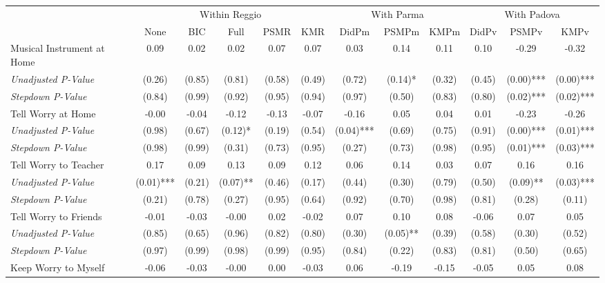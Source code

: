 \begin{tabular}{l c c c c c c c c c c c}
\toprule
& \multicolumn{5}{c}{Within Reggio} & \multicolumn{3}{c}{With Parma} & \multicolumn{3}{c}{With Padova} \\\cmidrule(lr){2-6} \cmidrule(lr){7-9} \cmidrule(lr){10-12}
 & None & BIC & Full & PSMR & KMR & DidPm & PSMPm & KMPm & DidPv & PSMPv & KMPv \\
\midrule
Musical Instrument at Home & 0.09 & 0.02 & 0.02 & 0.07 & 0.07 & 0.03 & 0.14 & 0.11 & 0.10 & -0.29 & -0.32 \\
\quad \textit{Unadjusted P-Value} & (0.26) & (0.85) & (0.81) & (0.58) & (0.49) & (0.72) & (0.14)* & (0.32) & (0.45) & (0.00)*** & (0.00)*** \\
\quad \textit{Stepdown P-Value} & (0.84) & (0.99) & (0.92) & (0.95) & (0.94) & (0.97) & (0.50) & (0.83) & (0.80) & (0.02)*** & (0.02)*** \\
Tell Worry at Home & -0.00 & -0.04 & -0.12 & -0.13 & -0.07 & -0.16 & 0.05 & 0.04 & 0.01 & -0.23 & -0.26 \\
\quad \textit{Unadjusted P-Value} & (0.98) & (0.67) & (0.12)* & (0.19) & (0.54) & (0.04)*** & (0.69) & (0.75) & (0.91) & (0.00)*** & (0.01)*** \\
\quad \textit{Stepdown P-Value} & (0.98) & (0.99) & (0.31) & (0.73) & (0.95) & (0.27) & (0.73) & (0.98) & (0.95) & (0.01)*** & (0.03)*** \\
Tell Worry to Teacher & 0.17 & 0.09 & 0.13 & 0.09 & 0.12 & 0.06 & 0.14 & 0.03 & 0.07 & 0.16 & 0.16 \\
\quad \textit{Unadjusted P-Value} & (0.01)*** & (0.21) & (0.07)** & (0.46) & (0.17) & (0.44) & (0.30) & (0.79) & (0.50) & (0.09)** & (0.03)*** \\
\quad \textit{Stepdown P-Value} & (0.21) & (0.78) & (0.27) & (0.95) & (0.64) & (0.92) & (0.70) & (0.98) & (0.81) & (0.28) & (0.11) \\
Tell Worry to Friends & -0.01 & -0.03 & -0.00 & 0.02 & -0.02 & 0.07 & 0.10 & 0.08 & -0.06 & 0.07 & 0.05 \\
\quad \textit{Unadjusted P-Value} & (0.85) & (0.65) & (0.96) & (0.82) & (0.80) & (0.30) & (0.05)** & (0.39) & (0.58) & (0.30) & (0.52) \\
\quad \textit{Stepdown P-Value} & (0.97) & (0.99) & (0.98) & (0.99) & (0.95) & (0.84) & (0.22) & (0.83) & (0.81) & (0.50) & (0.65) \\
Keep Worry to Myself & -0.06 & -0.03 & -0.00 & 0.00 & -0.03 & 0.06 & -0.19 & -0.15 & -0.05 & 0.05 & 0.08 \\

\end{tabular}
